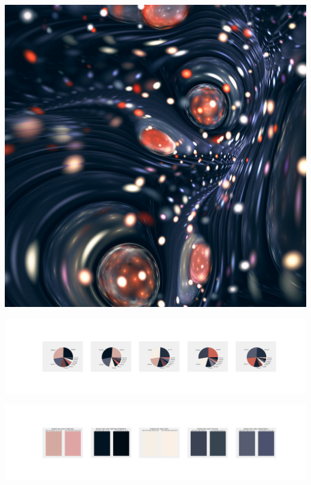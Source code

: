 \documentclass[11pt]{article}
\begin{document}
\begin{landscape}
    \begin{center}
    \includegraphics[width=\textwidth]{./nbimg/file (308).jpg}
    \end{center}

    \begin{center}
    \includegraphics[width=250mm]{./nbimg/pie-232.jpg}
    \end{center}

    \begin{center}
    \includegraphics[width=250mm]{./nbimg/peak-232.jpg}
    \end{center}
    


\end{landscape}
\end{document}
